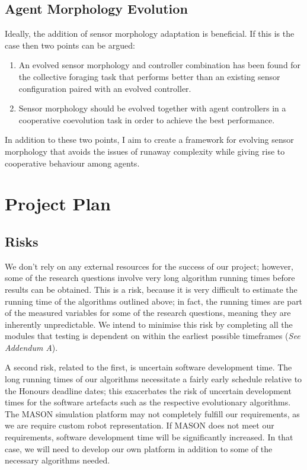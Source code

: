 \documentclass[a4paper,12pt]{article}
\begin{document}
\subsection{Agent Morphology Evolution}
Ideally, the addition of sensor morphology adaptation is beneficial. If this is the case then two points can be argued:
\begin{enumerate}
\item An evolved sensor morphology and controller combination has been found for the collective foraging task that performs better than an existing sensor configuration paired with an evolved controller.
\item Sensor morphology should be evolved together with agent controllers in a cooperative coevolution task in order to achieve the best performance.
\end{enumerate}

In addition to these two points, I aim to create a framework for evolving sensor morphology that avoids the issues of runaway complexity while giving rise to cooperative behaviour among agents.

\section{Project Plan}

\subsection{Risks}
We don’t rely on any external resources for the success of our project; however, some of the research questions involve very long algorithm running times before results can be obtained. This is a risk, because it is very difficult to estimate the running time of the algorithms outlined above; in fact, the running times are part of the measured variables for some of the research questions, meaning they are inherently unpredictable. We intend to minimise this risk by completing all the modules that testing is dependent on within the earliest possible timeframes (\textit{See Addendum A}).

A second risk, related to the first, is uncertain software development time. The long running times of our algorithms necessitate a fairly early schedule relative to the Honours deadline dates; this exacerbates the risk of uncertain development times for the software artefacts such as the respective evolutionary algorithms. The MASON simulation platform may not completely fulfill our requirements, as we are require custom robot representation. If MASON does not meet our requirements, software development time will be significantly increased. In that case, we will need to develop our own platform in addition to some of the necessary algorithms needed.
\end{document}
